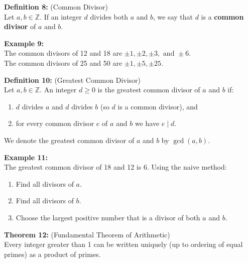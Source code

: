 \documentclass[12pt]{article}
\begin{document}
\noindent\textbf{Definition 8:} (Common Divisor)
\label{def:commondivisor}
\\Let $a,b \in \mathbb{Z}$. If an integer $d$ divides both $a$ and $b$, we say that $d$ is a \textbf{common divisor} of $a$ and $b$.

\vspace{5mm}

\noindent\textbf{Example 9:}
\label{ex:commondvs}
\\The common divisors of 12 and 18 are $\pm1, \pm2, \pm3, \text{ and } \pm6$.
\\The common divisors of 25 and 50 are $\pm1, \pm5, \pm25$.

\vspace{5mm}

\noindent\textbf{Definition 10:} (Greatest Common Divisor)
\label{def:gcd}
\\Let $a,b \in \mathbb{Z}$. An integer $d\ge 0$ is the greatest common divisor of $a$ and $b$ if:
\begin{enumerate}
    \item $d$ divides $a$ and $d$ divides $b$ (so $d$ is a common divisor), and
    \item for every common divisor $e$ of $a$ and $b$ we have $e \mid d$.
\end{enumerate}
We denote the greatest common divisor of $a$ and $b$ by $\gcd(a,b)$.

\vspace{5mm}

\noindent\textbf{Example 11:}
\label{ex:gcdnaive}
\\The greatest common divisor of 18 and 12 is 6. Using the naive method: 
\begin{enumerate}
    \item Find all divisors of $a$.
    \item Find all divisors of $b$.
    \item Choose the largest positive number that is a divisor of both $a$ and $b$.
\end{enumerate}

\vspace{5mm}

\noindent\textbf{Theorem 12:} (Fundamental Theorem of Arithmetic)
\label{thm:fta}
\\Every integer greater than 1 can be written uniquely (up to ordering of equal primes) as a product of primes.

\vspace{5mm}
\end{document}
